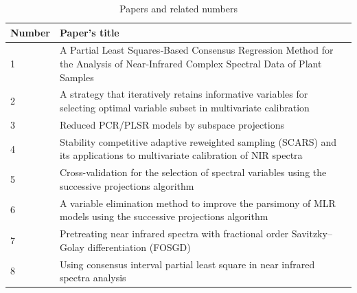 \documentclass[a4paper,12pt,titlepage]{article} %
\numberwithin{equation}{section}  %
\begin{document}
	\begin{landscape}
		
		\begin{table}[]
			\begin{tabular}{ll}
				\hline
				Number & Paper's title                                                                                                                          \\ \hline
				1      & A Partial Least Squares‐Based Consensus Regression Method for the Analysis of Near‐Infrared Complex Spectral Data of Plant Samples \\
				2      & A strategy that iteratively retains informative variables for selecting optimal variable subset in multivariate calibration            \\
				3      & Reduced PCR/PLSR models by subspace projections                                                                                        \\
				4      & Stability competitive adaptive reweighted sampling (SCARS) and its applications to multivariate calibration of NIR spectra             \\
				5      & Cross-validation for the selection of spectral variables using the successive projections algorithm                                    \\
				6      & A variable elimination method to improve the parsimony of MLR models using the successive projections algorithm                        \\
				7      & Pretreating near infrared spectra with fractional order Savitzky–Golay differentiation (FOSGD)                                       \\
				8      & Using consensus interval partial least square in near infrared spectra analysis                                                        
			\end{tabular}
			\caption{Papers and related numbers}
			\label{tab:papers}
		\end{table}
		
	\end{landscape}
	
\end{document}
